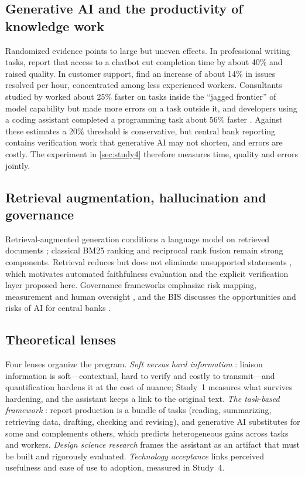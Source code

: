\documentclass[11pt]{article}
\begin{document}
\subsection{Generative AI and the productivity of knowledge work}
Randomized evidence points to large but uneven effects. In professional writing tasks, \citet{noy2023experimental} report that access to a chatbot cut completion time by about 40\% and raised quality. In customer support, \citet{brynjolfsson2025genai} find an increase of about 14\% in issues resolved per hour, concentrated among less experienced workers. Consultants studied by \citet{dellacqua2023jagged} worked about 25\% faster on tasks inside the ``jagged frontier'' of model capability but made more errors on a task outside it, and developers using a coding assistant completed a programming task about 56\% faster \citep{peng2023copilot}. Against these estimates a 20\% threshold is conservative, but central bank reporting contains verification work that generative AI may not shorten, and errors are costly. The experiment in \cref{sec:study4} therefore measures time, quality and errors jointly.

\subsection{Retrieval augmentation, hallucination and governance}
Retrieval-augmented generation conditions a language model on retrieved documents \citep{lewis2020rag}; classical BM25 ranking \citep{robertson2009bm25} and reciprocal rank fusion \citep{cormack2009rrf} remain strong components. Retrieval reduces but does not eliminate unsupported statements \citep{ji2023hallucination}, which motivates automated faithfulness evaluation \citep{es2024ragas} and the explicit verification layer proposed here. Governance frameworks emphasize risk mapping, measurement and human oversight \citep{nist2023airmf}, and the BIS discusses the opportunities and risks of AI for central banks \citep{bis2024aer}.

\subsection{Theoretical lenses}
Four lenses organize the program. \emph{Soft versus hard information} \citep{stein2002information,petersen2004information}: liaison information is soft---contextual, hard to verify and costly to transmit---and quantification hardens it at the cost of nuance; Study~1 measures what survives hardening, and the assistant keeps a link to the original text. \emph{The task-based framework} \citep{acemoglu2011skills}: report production is a bundle of tasks (reading, summarizing, retrieving data, drafting, checking and revising), and generative AI substitutes for some and complements others, which predicts heterogeneous gains across tasks and workers. \emph{Design science research} \citep{hevner2004design,peffers2007dsrm} frames the assistant as an artifact that must be built and rigorously evaluated. \emph{Technology acceptance} \citep{davis1989tam} links perceived usefulness and ease of use to adoption, measured in Study~4.
\end{document}
